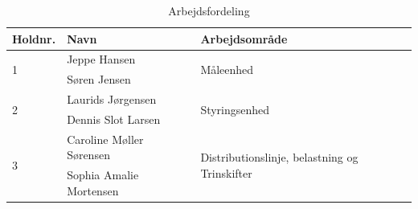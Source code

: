 \begin{table}[H]
	\centering
	\caption{Arbejdsfordeling}
	\label{tab:arbejdsfordeling}
	\begin{tabular}{@{}lll@{}}
		\toprule
		Holdnr.            & Navn                    & Arbejdsområde                                                  \\ \midrule
		\multirow{2}{*}{1} & Jeppe Hansen            & \multirow{2}{*}{Måleenhed}                                     \\
		& Søren Jensen            &                                                                \\\midrule
		\multirow{2}{*}{2} & Laurids Jørgensen       & \multirow{2}{*}{Styringsenhed}                                 \\
		& Dennis Slot Larsen            &                                                                \\\midrule
		\multirow{2}{*}{3} & Caroline Møller Sørensen         & \multirow{2}{*}{Distributionslinje, belastning og Trinskifter} \\
		& Sophia Amalie Mortensen &                                                                \\ \midrule
	\end{tabular}
\end{table}


